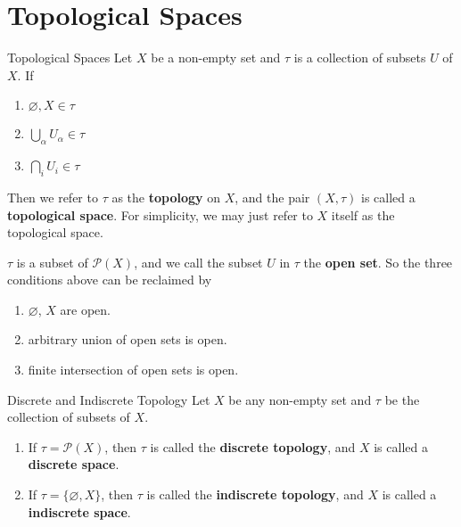 \section{Topological Spaces}
\begin{definition}{Topological Spaces}{}
    Let $X$ be a non-empty set and $\tau$ is a collection of subsets
    $U$ of $X$. If

    \begin{enumerate}

        \item $\varnothing, X \in \tau$
        \item $\bigcup_{\alpha} U_{\alpha} \in \tau$
        \item $\bigcap_{i} U_{i} \in \tau$

    \end{enumerate}
    Then we refer to $\tau$ as the \textbf{topology} on $X$, and the pair
    $(X,\tau)$ is called a \textbf{topological space}. For
    simplicity, we may just refer to $X$ itself as the
    topological space.
\end{definition}

\begin{remarks}
    $\tau$ is a subset of $\mathcal{P}(X)$, and we call the subset
    $U$ in $\tau$ the \textbf{open set}. So the three conditions
    above can be reclaimed by
    \begin{enumerate}
        \item $\varnothing$, $X$ are open.
        \item arbitrary union of open sets is open.
        \item finite intersection of open sets is open.
    \end{enumerate}
\end{remarks}

\begin{definition}{Discrete and Indiscrete Topology}{}
    Let $X$ be any non-empty set and $\tau$ be the collection of
    subsets of $X$.
    \begin{enumerate}

        \item If $\tau = \mathcal{P}(X)$, then $\tau$ is called the
            \textbf{discrete topology}, and $X$ is called a
            \textbf{discrete space}.
        \item If $\tau = \{\varnothing, X\}$, then $\tau$ is called the
            \textbf{indiscrete topology}, and $X$ is called a
            \textbf{indiscrete space}.

    \end{enumerate}
\end{definition}

